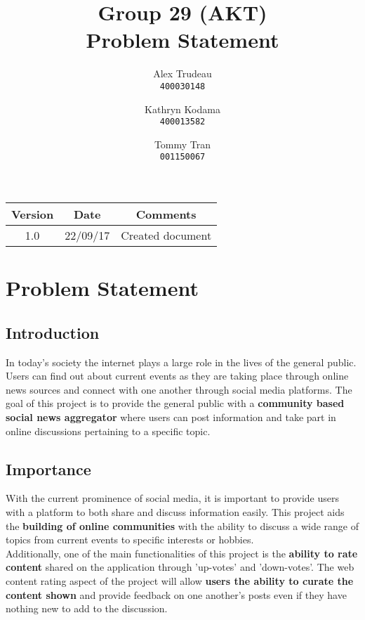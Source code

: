\documentclass[12pt,fleqn]{article}
\title{Group 29 (AKT)\\ Problem Statement}
\author{
Alex Trudeau\\
	\texttt{400030148}
\and
Kathryn Kodama\\
  	\texttt{400013582}
\and
Tommy Tran\\
	\texttt{001150067}
}
\begin{document}
\maketitle

\begin{center}

\begin{tabular}{ |c| c| c| }
\hline
Version & Date & Comments \\
\hline
1.0 & 22/09/17 & Created document \\
\hline
\end{tabular}
\end{center}


\pagebreak
\section {Problem Statement}

\subsection{Introduction}

In today's society the internet plays a large role in the lives of the general public. Users can find out about current events as they are taking place through online news sources and connect with one another through social media platforms.  The goal of this project is to provide the general public with a \textbf{community based social news aggregator} where users can post information and take part in online discussions pertaining to a specific topic. 

\subsection{Importance}

With the current prominence of social media, it is important to provide users with a platform to both share and discuss information easily.  This project aids the \textbf{building of online communities} with the ability to discuss a wide range of topics from current events to specific interests or hobbies. \\
\newline
Additionally, one of the main functionalities of this project is the \textbf{ability to rate content} shared on the application through 'up-votes' and 'down-votes'.  The web content rating aspect of the project will allow \textbf{users the ability to curate the content shown} and provide feedback on one another's posts even if they have nothing new to add to the discussion.  
\end{document}
